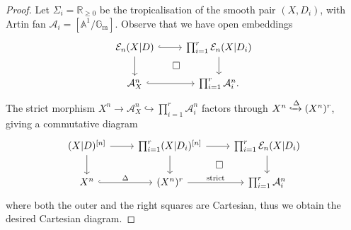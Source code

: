 \documentclass[10pt,a4paper]{amsart}
\def\A{\mathcal{A}}
\def\AA{\mathbb{A}}
\def\Gm{\mathbb{G}_\mathrm{m}}
\def\Rgeq{\mathbb{R}_{\geq 0}}
\newcommand{\cal}[1]{\mathcal{#1}}
\def\gridexp{\mathcal{E}_n(X|D)}
\def\logProd{(X|D)^{[n]}}
\newcommand{\logProdexample}[3]{(#1|#2)^{[#3]}}
\newcommand{\pullback}[1]{\arrow[#1, phantom, "\square" , color=black]}
\begin{document}
\begin{proof}
	Let $\Sigma_i = \Rgeq$ be the tropicalisation of the smooth pair $(X,D_i)$, with Artin fan $\A_i = [\AA^1 / \Gm]$. Observe that we have open embeddings
	\begin{equation*}
		\begin{tikzcd}
			\gridexp \arrow[r,hook] \arrow[d] \pullback{rd} &\prod_{i=1}^{r}\cal{E}_n(X|D_i) \arrow[d]\\
			\A_X^n \arrow[r, hook] & \prod_{i=1}^{r} \A_i^n.
		\end{tikzcd}
	\end{equation*}
	The strict morphism $X^n \to \A_X^n \hookrightarrow\prod_{i=1}^{r} \A_i^n$ factors through $X^n \xhookrightarrow{\Delta} (X^n)^r$, giving a commutative diagram
	\begin{equation*}
		\begin{tikzcd}
			\logProd \arrow[r] \arrow[d] & \prod_{i=1}^{r}\logProdexample{X}{D_i}{n} \arrow[r] \arrow[d] \pullback{rd} & \prod_{i=1}^{r}\cal{E}_n(X|D_i) \arrow[d]\\
			X^n \arrow[r, "\Delta", hook] & (X^n)^r \arrow[r, "\text{strict}"] & \prod_{i=1}^{r} \A_i^n
		\end{tikzcd}
	\end{equation*}
	where both the outer and the right squares are Cartesian, thus we obtain the desired Cartesian diagram.
\end{proof}
\end{document}

